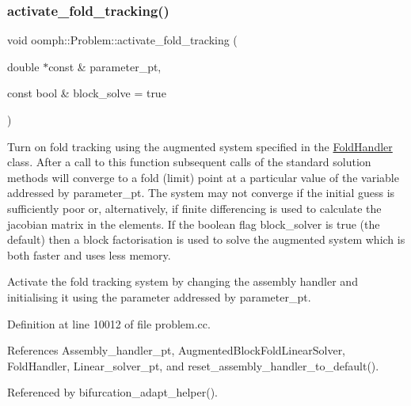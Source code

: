 \mbox{\label{classoomph_1_1Problem_acf20e92281911dfbb423ea82542c0485}} 
\subsubsection{\texorpdfstring{activate\+\_\+fold\+\_\+tracking()}{activate\_fold\_tracking()}}
{\footnotesize\ttfamily void oomph\+::\+Problem\+::activate\+\_\+fold\+\_\+tracking (\begin{DoxyParamCaption}\item[{double $\ast$const \&}]{parameter\+\_\+pt,  }\item[{const bool \&}]{block\+\_\+solve = {\ttfamily true} }\end{DoxyParamCaption})}



Turn on fold tracking using the augmented system specified in the \hyperlink{classoomph_1_1FoldHandler}{Fold\+Handler} class. After a call to this function subsequent calls of the standard solution methods will converge to a fold (limit) point at a particular value of the variable addressed by parameter\+\_\+pt. The system may not converge if the initial guess is sufficiently poor or, alternatively, if finite differencing is used to calculate the jacobian matrix in the elements. If the boolean flag block\+\_\+solver is true (the default) then a block factorisation is used to solve the augmented system which is both faster and uses less memory. 

Activate the fold tracking system by changing the assembly handler and initialising it using the parameter addressed by parameter\+\_\+pt. 

Definition at line 10012 of file problem.\+cc.



References Assembly\+\_\+handler\+\_\+pt, Augmented\+Block\+Fold\+Linear\+Solver, Fold\+Handler, Linear\+\_\+solver\+\_\+pt, and reset\+\_\+assembly\+\_\+handler\+\_\+to\+\_\+default().



Referenced by bifurcation\+\_\+adapt\+\_\+helper().

\mbox{\label{classoomph_1_1Problem_ac5966d1a184e722195f96d797b52e64c}} 
